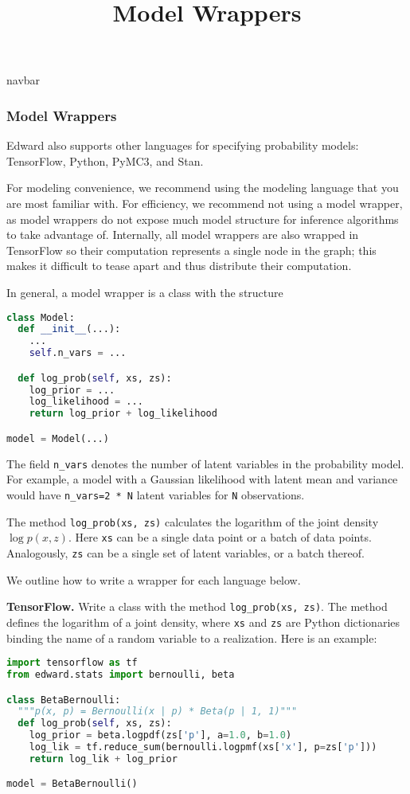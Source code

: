 \title{Model Wrappers}

{{navbar}}

\subsubsection{Model Wrappers}

Edward also supports other languages for specifying probability models:
TensorFlow, Python, PyMC3, and Stan.

For modeling convenience, we recommend using the modeling language
that you are most familiar with. For efficiency, we recommend not
using a model wrapper, as model wrappers do not expose much model
structure for inference algorithms to take advantage of.
Internally, all model wrappers are also wrapped in TensorFlow so their
computation represents a single node in the graph; this makes it difficult
to tease apart and thus distribute their computation.

In general, a model wrapper is a class with the structure

\begin{lstlisting}[language=Python]
class Model:
  def __init__(...):
    ...
    self.n_vars = ...

  def log_prob(self, xs, zs):
    log_prior = ...
    log_likelihood = ...
    return log_prior + log_likelihood

model = Model(...)
\end{lstlisting}

The field \texttt{n_vars} denotes the number of latent variables in the
probability model. For example, a model with a Gaussian likelihood with latent
mean and variance would have \texttt{n_vars=2 * N} latent variables for
\texttt{N} observations.

The method \texttt{log_prob(xs, zs)} calculates the logarithm of
the joint density $\log p(x,z)$. Here \texttt{xs} can be a single data
point or a batch of data points. Analogously, \texttt{zs} can be a
single set of latent variables, or a batch thereof.

We outline how to write a wrapper for each language below.

\textbf{TensorFlow.}
Write a class with the method \texttt{log_prob(xs, zs)}. The method defines
the logarithm of a joint density, where \texttt{xs} and \texttt{zs} are Python
dictionaries binding the name of a random variable to
a realization.
Here is an example:

\begin{lstlisting}[language=Python]
import tensorflow as tf
from edward.stats import bernoulli, beta

class BetaBernoulli:
  """p(x, p) = Bernoulli(x | p) * Beta(p | 1, 1)"""
  def log_prob(self, xs, zs):
    log_prior = beta.logpdf(zs['p'], a=1.0, b=1.0)
    log_lik = tf.reduce_sum(bernoulli.logpmf(xs['x'], p=zs['p']))
    return log_lik + log_prior

model = BetaBernoulli()
\end{lstlisting}

